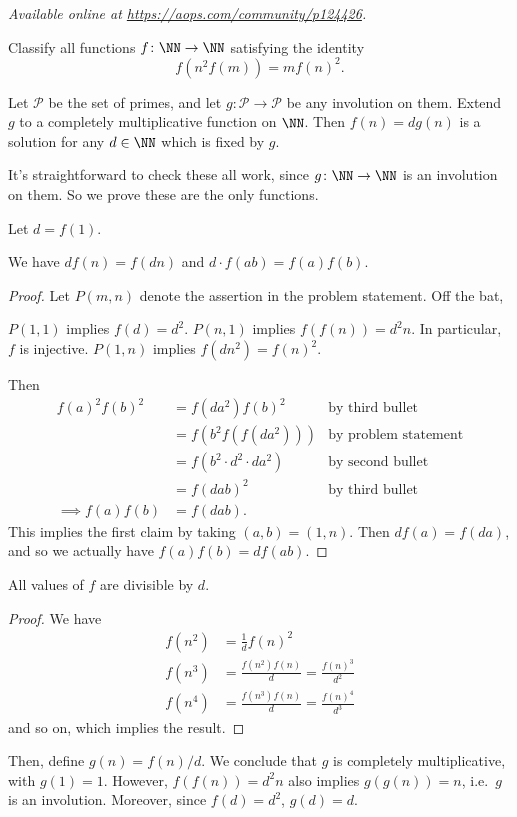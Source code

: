 
\textsl{Available online at \url{https://aops.com/community/p124426}.}
\begin{mdframed}[style=mdpurplebox,frametitle={Problem statement}]
Classify all functions $f \colon \NN \to \NN$
satisfying the identity
\[ f(n^2 f(m)) = m f(n)^2. \]
\end{mdframed}
Let $\mathcal P$ be the set of primes,
and let $g \colon \mathcal P \to \mathcal P$ be any involution on them.
Extend $g$ to a completely multiplicative function on $\NN$.
Then $f(n) = d g(n)$ is a solution for any $d \in \NN$
which is fixed by $g$.

It's straightforward to check these all work,
since $g \colon \NN \to \NN$ is an involution on them.
So we prove these are the only functions.

Let $d = f(1)$.
\begin{claim*}
  We have $df(n) = f(dn)$ and $d \cdot f(ab) = f(a) f(b)$.
\end{claim*}
\begin{proof}
  Let $P(m,n)$ denote the assertion in the problem statement.
  Off the bat,
  \begin{itemize}
    \ii $P(1,1)$ implies $f(d) = d^2$.
    \ii $P(n,1)$ implies $f(f(n)) = d^2n$.
    In particular, $f$ is injective.
    \ii $P(1,n)$ implies $f(dn^2) = f(n)^2$.
  \end{itemize}
  Then
  \begin{align*}
    f(a)^2 f(b)^2 &= f(da^2) f(b)^2 & \text{by third bullet}\\
    &= f(b^2 f(f(da^2))) & \text{by problem statement} \\
    &= f(b^2 \cdot d^2 \cdot da^2) & \text{by second bullet} \\
    &= f(dab)^2 & \text{by third bullet} \\
    \implies f(a) f(b) &= f(dab).
  \end{align*}
  This implies the first claim by taking $(a,b) = (1,n)$.
  Then $df(a) = f(da)$, and so we actually have
  $f(a) f(b) = d f(ab)$.
\end{proof}
\begin{claim*}
  All values of $f$ are divisible by $d$.
\end{claim*}
\begin{proof}
  We have
  \begin{align*}
    f(n^2) &= \frac 1d f(n)^2 \\
    f(n^3) &= \frac{f(n^2) f(n)}{d} = \frac{f(n)^3}{d^2} \\
    f(n^4) &= \frac{f(n^3) f(n)}{d} = \frac{f(n)^4}{d^3}
  \end{align*}
  and so on,
  which implies the result.
\end{proof}
Then, define $g(n) = f(n) / d$.
We conclude that $g$ is completely multiplicative, with $g(1) = 1$.
However, $f(f(n)) = d^2n$ also implies $g(g(n)) = n$,
i.e.\ $g$ is an involution.
Moreover, since $f(d) = d^2$, $g(d) = d$.

